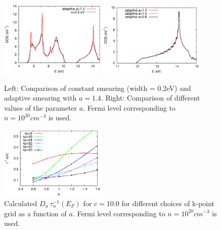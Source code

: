 \documentclass[
amsmath,amssymb,
aps,
prb,
]{revtex4}
\begin{document}
%
\begin{figure}[!ht]
\includegraphics[width=0.45\textwidth]{DOS1-32.eps}
\includegraphics[width=0.45\textwidth]{DOS2-32.eps}
\caption{\label{fig:dos} Left: Comparison of constant smearing (width = 0.2eV) and adaptive smearing with $a=1.4$. 
Right: Comparison of different values of the parameter $a$. Fermi level corresponding to $n=10^{20} cm^{-3}$ is used.}
\end{figure}
%
%
\begin{figure}[!ht]
\includegraphics[width=0.45\textwidth]{invtau_vs_a.eps}
\caption{\label{fig:tauef} Calculated $D_n\, \tau^{-1}_n(E_F)$ for $c=10.0$ for different choices of k-point grid as a function of $a$.
Fermi level corresponding to $n=10^{20} cm^{-3}$ is used.}
\end{figure}
%
%
\end{document}
